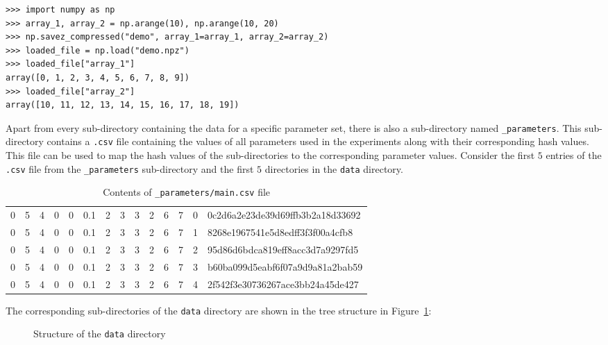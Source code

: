\begin{lstlisting}[style=pystyle]
>>> import numpy as np
>>> array_1, array_2 = np.arange(10), np.arange(10, 20)
>>> np.savez_compressed("demo", array_1=array_1, array_2=array_2)
>>> loaded_file = np.load("demo.npz")
>>> loaded_file["array_1"]
array([0, 1, 2, 3, 4, 5, 6, 7, 8, 9])
>>> loaded_file["array_2"]
array([10, 11, 12, 13, 14, 15, 16, 17, 18, 19])

\end{lstlisting}

Apart from every sub-directory containing the data for a specific parameter set,
there is also a sub-directory named \lstinline{_parameters}.
This sub-directory contains a \lstinline{.csv} file containing the
values of all parameters used in the experiments along with their corresponding
hash values.
This file can be used to map the hash values of the sub-directories to the
corresponding parameter values.
Consider the first \(5\) entries of the \lstinline{.csv} file
from the \lstinline{_parameters} sub-directory and the first
\(5\) directories in the \lstinline{data} directory.

\begin{table}[H]
    \centering
    \caption{Contents of \lstinline{_parameters/main.csv} file}
    \begin{tabular}{|cccccccccccccl|}
        \hline
        0 & 5 & 4 & 0 & 0 & 0.1 & 2 & 3 & 3 & 2 & 6 & 7 & 0 &
        0c2d6a2e23de39d69ffb3b2a18d33692 \\
        0 & 5 & 4 & 0 & 0 & 0.1 & 2 & 3 & 3 & 2 & 6 & 7 & 1 &
        8268e1967541e5d8edff3f3f00a4cfb8 \\
        0 & 5 & 4 & 0 & 0 & 0.1 & 2 & 3 & 3 & 2 & 6 & 7 & 2 &
        95d86d6bdca819eff8acc3d7a9297fd5 \\
        0 & 5 & 4 & 0 & 0 & 0.1 & 2 & 3 & 3 & 2 & 6 & 7 & 3 &
        b60ba099d5eabf6f07a9d9a81a2bab59 \\
        0 & 5 & 4 & 0 & 0 & 0.1 & 2 & 3 & 3 & 2 & 6 & 7 & 4 &
        2f542f3e30736267ace3bb24a45de427 \\
        \hline
    \end{tabular}
    \label{tab:parameters_csv}
\end{table}

The corresponding sub-directories of the \lstinline{data}
directory are shown in the tree structure in Figure~\ref{fig:data_directory}:

\begin{figure}[H]
    \caption{Structure of the \lstinline{data} directory}
    \label{fig:data_directory}
\end{figure}
    
